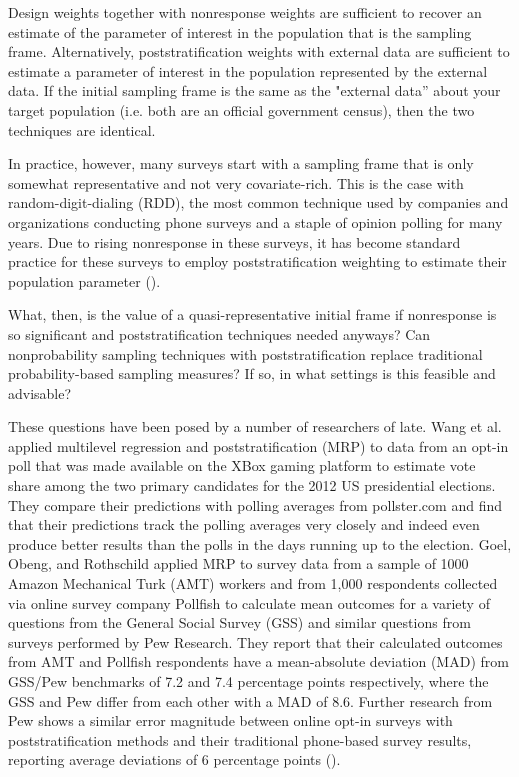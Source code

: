 \documentclass[a4paper,12pt]{article}
\theoremstyle{proposition}
\begin{document}
Design weights together with nonresponse weights are sufficient to recover an estimate of the parameter of interest in the population that is the sampling frame. Alternatively, poststratification weights with external data are sufficient to estimate a parameter of interest in the population represented by the external data. If the initial sampling frame is the same as the "external data'' about your target population (i.e. both are an official government census), then the two techniques are identical.

In practice, however, many surveys start with a sampling frame that is only somewhat representative and not very covariate-rich. This is the case with random-digit-dialing (RDD), the most common technique used by companies and organizations conducting phone surveys and a staple of opinion polling for many years. Due to rising nonresponse in these surveys, it has become standard practice for these surveys to employ poststratification weighting to estimate their population parameter (\cite{Gelman1997}).

What, then, is the value of a quasi-representative initial frame if nonresponse is so significant and poststratification techniques needed anyways? Can nonprobability sampling techniques with poststratification replace traditional probability-based sampling measures? If so, in what settings is this feasible and advisable?

These questions have been posed by a number of researchers of late. Wang et al. \parencite*{Wang2015} applied multilevel regression and poststratification (MRP) to data from an opt-in poll that was made available on the XBox gaming platform to estimate vote share among the two primary candidates for the 2012 US presidential elections. They compare their predictions with polling averages from pollster.com and find that their predictions track the polling averages very closely and indeed even produce better results than the polls in the days running up to the election. Goel, Obeng, and Rothschild \parencite*{Goel2015} applied MRP to survey data from a sample of 1000 Amazon Mechanical Turk (AMT) workers and from 1,000 respondents collected via online survey company Pollfish to calculate mean outcomes for a variety of questions from the General Social Survey (GSS) and similar questions from surveys performed by Pew Research. They report that their calculated outcomes from AMT and Pollfish respondents have a mean-absolute deviation (MAD) from GSS/Pew benchmarks of 7.2 and 7.4 percentage points respectively, where the GSS and Pew differ from each other with a MAD of 8.6. Further research from Pew shows a similar error magnitude between online opt-in surveys with poststratification methods and their traditional phone-based survey results, reporting average deviations of 6 percentage points (\cite{Mercer2018}).
\end{document}

